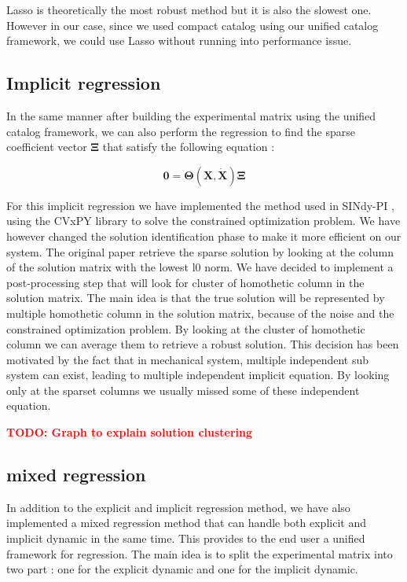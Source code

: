 \documentclass[12pt]{article}
\newcommand{\TODO}[1]{\textbf{\textcolor{red}{\Large TODO: \normalsize #1}}}
\begin{document}
Lasso is theoretically the most robust method but it is also the slowest one. However in our case, since we used compact catalog using our unified catalog framework, we could use Lasso without running into performance issue.


\subsection*{Implicit regression}

In the same manner after building the experimental matrix using the unified catalog framework, we can also perform the regression to find the sparse coefficient vector $\mathbf{\Xi}$ that satisfy the following equation :

\begin{equation}
	\mathbf{0} = \mathbf{\Theta}(\mathbf{X}, \dot{\mathbf{X}})\mathbf{\Xi}
\end{equation}

For this implicit regression we have implemented the method used in SINdy-PI \cite{kahemanSINDyPIRobustAlgorithm2020}, using the CVxPY library to solve the constrained optimization problem. We have however changed the solution identification phase to make it more efficient on our system. The original paper retrieve the sparse solution by looking at the column of the solution matrix with the lowest l0 norm. 
We have decided to implement a post-processing step that will look for cluster of homothetic column in the solution matrix. The main idea is that the true solution will be represented by multiple homothetic column in the solution matrix, because of the noise and the constrained optimization problem. By looking at the cluster of homothetic column we can average them to retrieve a robust solution.
This decision has been motivated by the fact that in mechanical system, multiple independent sub system can exist, leading to multiple independent implicit equation. By looking only at the sparset columns we usually missed some of these independent equation.

\TODO{ Graph to explain solution clustering}

\subsection*{mixed regression}

In addition to the explicit and implicit regression method, we have also implemented a mixed regression method that can handle both explicit and implicit dynamic in the same time. This provides to the end user a unified framework for regression. The main idea is to split the experimental matrix into two part : one for the explicit dynamic and one for the implicit dynamic.
\end{document}
